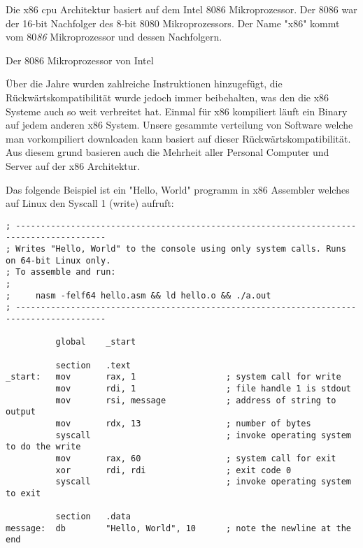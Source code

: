 Die x86 \acrshort{cpu} Architektur basiert auf dem Intel 8086 Mikroprozessor. \cite{Wikipediax86}
Der 8086 war der 16-bit Nachfolger des 8-bit 8080 Mikroprozessors.
Der Name "x86" kommt vom 80{\it 86} Mikroprozessor und dessen Nachfolgern.

    {Der 8086 Mikroprozessor von Intel}

Über die Jahre wurden zahlreiche Instruktionen hinzugefügt, die 
Rückwärtskompatibilität wurde jedoch immer beibehalten, was den die x86 
Systeme auch so weit verbreitet hat. Einmal für x86 kompiliert läuft ein
Binary auf jedem anderen x86 System. Unsere gesammte verteilung von 
Software welche man vorkompiliert downloaden kann basiert auf dieser 
Rückwärtskompatibilität. Aus diesem grund basieren auch die Mehrheit aller
Personal Computer und Server auf der x86 Architektur.



Das folgende Beispiel ist ein "Hello, World" programm in x86 Assembler 
welches auf Linux den Syscall 1 (write) aufruft:

\begin{verbatim}
; ----------------------------------------------------------------------------------------
; Writes "Hello, World" to the console using only system calls. Runs on 64-bit Linux only.
; To assemble and run:
;
;     nasm -felf64 hello.asm && ld hello.o && ./a.out
; ----------------------------------------------------------------------------------------

          global    _start

          section   .text
_start:   mov       rax, 1                  ; system call for write
          mov       rdi, 1                  ; file handle 1 is stdout
          mov       rsi, message            ; address of string to output
          mov       rdx, 13                 ; number of bytes
          syscall                           ; invoke operating system to do the write
          mov       rax, 60                 ; system call for exit
          xor       rdi, rdi                ; exit code 0
          syscall                           ; invoke operating system to exit

          section   .data
message:  db        "Hello, World", 10      ; note the newline at the end
\end{verbatim}
